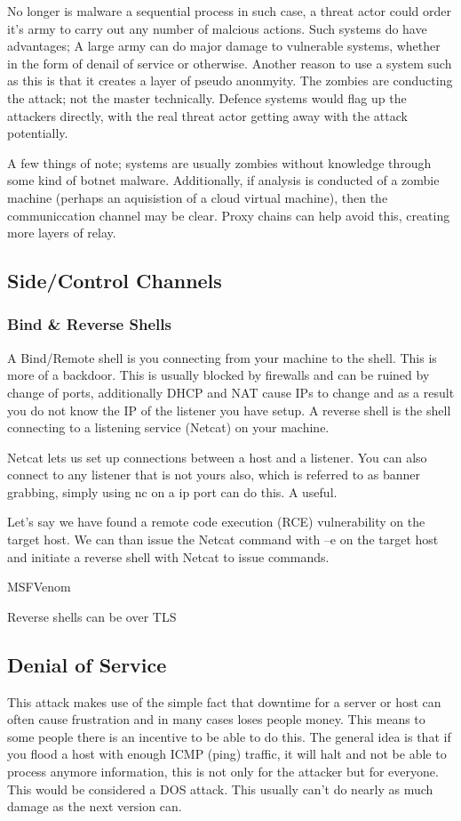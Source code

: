 No longer is malware a sequential process in such case, a threat actor could order it's army to carry out any number of malcious actions. Such systems do have advantages; A large army can do major damage to vulnerable systems, whether in the form of denail of service or otherwise.
Another reason to use a system such as this is that it creates a layer of pseudo anonmyity. The zombies are conducting the attack; not the master technically. Defence systems would flag up the attackers directly, with the real threat actor getting away with the attack potentially.

A few things of note; systems are usually zombies without knowledge through some kind of botnet malware. Additionally, if analysis is conducted of a zombie machine (perhaps an aquisistion of a cloud virtual machine), then the communiccation channel may be clear. Proxy chains can help avoid this, creating more layers of relay.

\subsection{Side/Control Channels}
\subsubsection{Bind & Reverse Shells}
A Bind/Remote shell is you connecting from your machine to the shell. This is more of a backdoor. This is usually blocked by firewalls and can be ruined by change of ports, additionally DHCP and NAT cause IPs to change and as a result you do not know the IP of the listener you have setup.
A reverse shell is the shell connecting to a listening service (Netcat) on your machine.

Netcat lets us set up connections between a host and a listener. You can also connect to any listener that is not yours also, which is referred to as banner grabbing, simply using nc on a ip port can do this. 
A useful. 

Let’s say we have found a remote code execution (RCE) vulnerability on the target host. We can than issue the Netcat command with –e on the target host and initiate a reverse shell with Netcat to issue commands.

MSFVenom

Reverse shells can be over TLS


\subsection{Denial of Service}
This attack makes use of the simple fact that downtime for a server or host can often cause frustration and in many cases loses people money. This means to some people there is an incentive to be able to do this. The general idea is that if you flood a host with enough ICMP (ping) traffic, it will halt and not be able to process anymore information, this is not only for the attacker but for everyone. This would be considered a DOS attack. 
This usually can't do nearly as much damage as the next version can. 

